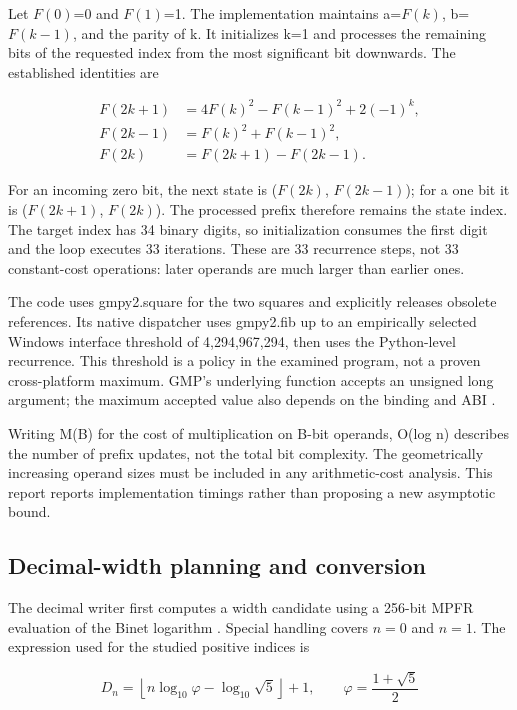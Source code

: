 \documentclass[11pt,a4paper]{article}
\begin{document}
Let $F(0)$=0 and $F(1)$=1. The implementation maintains a=$F(k)$, b=$F(k-1)$, and the parity of k. It initializes k=1 and processes the remaining bits of the requested index from the most significant bit downwards. The established identities are

\begin{equation}
\begin{aligned}F(2k+1)&=4F(k)^2-F(k-1)^2+2(-1)^k,\\F(2k-1)&=F(k)^2+F(k-1)^2,\\F(2k)&=F(2k+1)-F(2k-1).\end{aligned}
\end{equation}

For an incoming zero bit, the next state is ($F(2k)$, $F(2k-1)$); for a one bit it is ($F(2k+1)$, $F(2k)$). The processed prefix therefore remains the state index. The target index has 34 binary digits, so initialization consumes the first digit and the loop executes 33 iterations. These are 33 recurrence steps, not 33 constant-cost operations: later operands are much larger than earlier ones.

The code uses gmpy2.square for the two squares and explicitly releases obsolete references. Its native dispatcher uses gmpy2.fib up to an empirically selected Windows interface threshold of 4,294,967,294, then uses the Python-level recurrence. This threshold is a policy in the examined program, not a proven cross-platform maximum. GMP's underlying function accepts an unsigned long argument; the maximum accepted value also depends on the binding and ABI \cite{gmp_mpz}.

Writing M(B) for the cost of multiplication on B-bit operands, O(log n) describes the number of prefix updates, not the total bit complexity. The geometrically increasing operand sizes must be included in any arithmetic-cost analysis. This report reports implementation timings rather than proposing a new asymptotic bound.

\subsection{Decimal-width planning and conversion}

The decimal writer first computes a width candidate using a 256-bit MPFR evaluation of the Binet logarithm \cite{mpfr_paper} \cite{mpfr_manual}. Special handling covers $n=0$ and $n=1$. The expression used for the studied positive indices is

\begin{equation}
D_n=\left\lfloor n\log_{10}\varphi-\log_{10}\sqrt{5}\right\rfloor+1,\qquad\varphi=\frac{1+\sqrt{5}}{2}
\end{equation}
\end{document}
